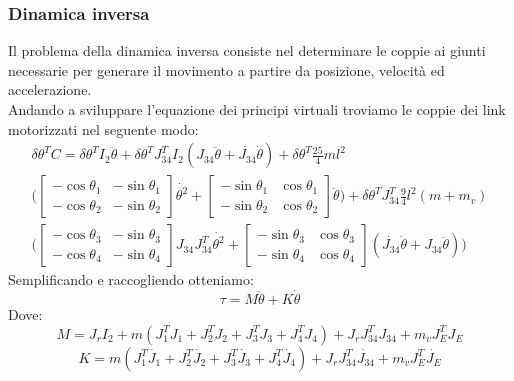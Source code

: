 \subsubsection{Dinamica inversa}
Il problema della dinamica inversa consiste nel determinare le coppie ai giunti necessarie per generare il movimento a partire da posizione, velocità ed accelerazione.
\\Andando a sviluppare l'equazione dei principi virtuali troviamo le coppie dei link motorizzati nel seguente modo:
\begin{equation*}
\begin{aligned}
    \delta \theta^T C = \delta \theta^T I_2 \ddot{\theta} + \delta \theta^T J_{34}^T I_2(J_{34}\ddot{\theta}+\dot{J_{34}}\dot{\theta})+ \delta \theta^T \frac{25}{4}ml^2\\\bigg(\begin{bmatrix}
    -\cos\theta_1 & -\sin\theta_1 \\ -\cos\theta_2 & -\sin\theta_2
    \end{bmatrix}
    \dot{\theta^2} + \begin{bmatrix}
    -\sin\theta_1 & \cos\theta_1 \\ -\sin\theta_2 & \cos\theta_2
    \end{bmatrix} \ddot{\theta}\bigg) +  \delta \theta^T J_{34}^T\frac{9}{4}l^2(m+m_v)\\\bigg(\begin{bmatrix}
    -\cos\theta_3 & -\sin\theta_3 \\ -\cos\theta_4 & -\sin\theta_4
    \end{bmatrix}J_{34}J_{34}^T\dot{\theta^2}+\begin{bmatrix}
    -\sin\theta_3 & \cos\theta_3 \\ -\sin\theta_4 & \cos\theta_4
    \end{bmatrix}(\dot{J_{34}}\dot{\theta}+J_{34}\ddot{\theta})\bigg)
    \end{aligned}
\end{equation*}
Semplificando e raccogliendo otteniamo:
\begin{equation}
    \tau = M \ddot{\theta} + K \dot{\theta}
    \label{eq:dinamicaInv}
\end{equation}
Dove:
\begin{equation}
    M = J_r I_2 + m(J_1^T J_1 + J_2^TJ_2+J_3^TJ_3+J_4^TJ_4)+J_rJ_{34}^TJ_{34} + m_vJ_E^TJ_E
    \label{eq:M}
\end{equation}
\begin{equation}
    K = m(J_1^T\dot{J_1}+J_2^T\dot{J_2}+J_3^T\dot{J_3}+J_4^T\dot{J_4})+J_rJ_{34}^T\dot{J_{34}}+m_vJ_E^T\dot{J_E}
    \label{eq:K}
\end{equation}
